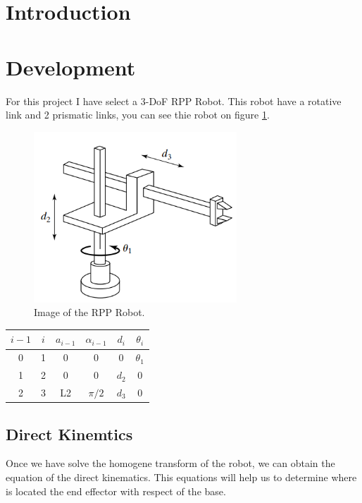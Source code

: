 \documentclass[12pt]{article}
\begin{document}
    \section{Introduction}

    \section{Development}
    For this project I have select a 3-DoF RPP Robot. This robot have a rotative link and 2 prismatic links, you can
    see thie robot on figure \ref{fig:robot}.
    \begin{figure}[h]
        \centering
        \includegraphics[width = 3in]{RPP.png}
        \caption{Image of the RPP Robot.}
        \label{fig:robot}
    \end{figure}

    \begin{table}[h]
        \begin{center}
            \begin{tabular}{c c c c c c}
                \hline
                $i-1$ & $i$ & $a_{i-1}$ & $\alpha_{i-1}$ & $d_i$ & $\theta_i$\\
                \hline
                0 & 1 & 0 & 0 & 0 & $\theta_1$\\
                1 & 2 & 0 & 0 & $d_2$ & 0\\
                2 & 3 & L2 & $\pi / 2$ & $d_3$ & 0\\
                \hline
            \end{tabular}
        \end{center}
        \label{table:DH_table}
    \end{table}
        \subsection{Direct Kinemtics}
        Once we have solve the homogene transform of the robot, we can obtain the equation of the direct kinematics.
        This equations will help us to determine where is located the end effector with respect of the base.
        
\end{document}
